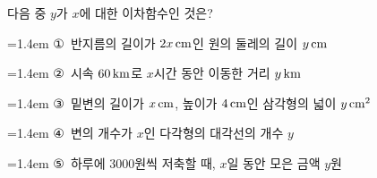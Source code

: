 다음 중 $y$가 $x$에 대한 이차함수인 것은?
\par\medskip\par\noindent\hangindent=1.4em {\small ①}\ 반지름의 길이가 $2x\mkern3mu \mathrm{cm}$인 원의 둘레의 길이 $y\mkern3mu \mathrm{cm}$\par\noindent\hangindent=1.4em {\small ②}\ 시속 $60\mkern3mu \mathrm{km}$로 $x$시간 동안 이동한 거리 $y\mkern3mu \mathrm{km}$\par\noindent\hangindent=1.4em {\small ③}\ 밑변의 길이가 $x\mkern3mu \mathrm{cm}$, 높이가 $4\mkern3mu \mathrm{cm}$인 삼각형의 넓이 $y\mkern3mu \mathrm{cm}^2$\par\noindent\hangindent=1.4em {\small ④}\ 변의 개수가 $x$인 다각형의 대각선의 개수 $y$\par\noindent\hangindent=1.4em {\small ⑤}\ 하루에 $3000$원씩 저축할 때, $x$일 동안 모은 금액 $y$원\par\medskip
